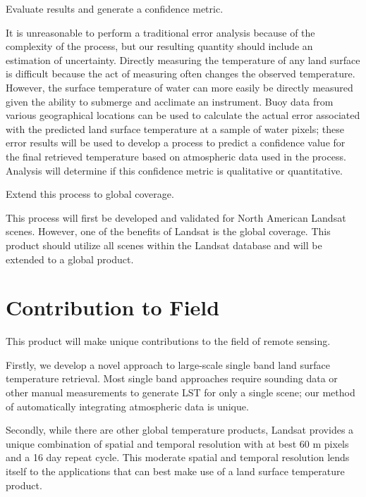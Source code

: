 \documentclass{book}
\begin{document}
\begin{enumerate}
{\bf \item Evaluate results and generate a confidence metric.}

It is unreasonable to perform a traditional error analysis because of the complexity of the process, but our resulting quantity should include an estimation of uncertainty.  Directly measuring the temperature of any land surface is difficult because the act of measuring often changes the observed temperature.  However, the surface temperature of water can more easily be directly measured given the ability to submerge and acclimate an instrument.  Buoy data from various geographical locations can be used to calculate the actual error associated with the predicted land surface temperature at a sample of water pixels; these error results will be used to develop a process to predict a confidence value for the final retrieved temperature based on atmospheric data used in the process.  Analysis will determine if this confidence metric is qualitative or quantitative.

{\bf \item Extend this process to global coverage.}

This process will first be developed and validated for North American Landsat scenes.  However, one of the benefits of Landsat is the global coverage.  This product should utilize all scenes within the Landsat database and will be extended to a global product.

\end{enumerate}

\section{Contribution to Field}
\label{sec:contributiontofield}

This product will make unique contributions to the field of remote sensing.  

Firstly, we develop a novel approach to large-scale single band land surface temperature retrieval.  Most single band approaches require sounding data or other manual measurements to generate LST for only a single scene; our method of automatically integrating atmospheric data is unique.

Secondly, while there are other global temperature products, Landsat provides a unique combination of spatial and temporal resolution with at best 60 m pixels and a 16 day repeat cycle.  This moderate spatial and temporal resolution lends itself to the applications that can best make use of a land surface temperature product.
\end{document}
